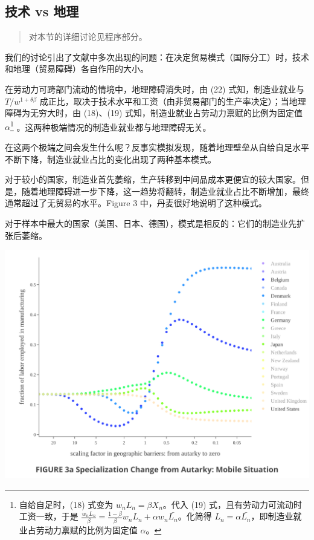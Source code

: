 \documentclass[
]{article}
\begin{document}
\hypertarget{ux6280ux672f-vs-ux5730ux7406}{%
\subsection{技术 vs 地理}\label{ux6280ux672f-vs-ux5730ux7406}}

\begin{quote}
对本节的详细讨论见程序部分。
\end{quote}

我们的讨论引出了文献中多次出现的问题：在决定贸易模式（国际分工）时，技术和地理（贸易障碍）各自作用的大小。

在劳动力可跨部门流动的情境中，地理障碍消失时，由 (22) 式知，制造业就业与 \(T/w^{1+\theta\beta}\) 成正比，取决于技术水平和工资（由非贸易部门的生产率决定）；当地理障碍为无穷大时，由 (18)、(19) 式知，制造业就业占劳动力禀赋的比例为固定值 \(\alpha\)\footnote{自给自足时，(18) 式变为
  \(w_n L_n = \beta X_n\)。代入 (19) 式，且有劳动力可流动时工资一致，于是
  \(\frac{w_n L_n}{\beta} = \frac{1-\beta}{\beta}w_n L_n+\alpha w_n \bar{L_n}\)。化简得
  \(L_n = \alpha \bar{L_n}\)，即制造业就业占劳动力禀赋的比例为固定值 \(\alpha\)。} 。这两种极端情况的制造业就业都与地理障碍无关。

在这两个极端之间会发生什么呢？反事实模拟发现，随着地理壁垒从自给自足水平不断下降，制造业就业占比的变化出现了两种基本模式。

对于较小的国家，制造业首先萎缩，生产转移到中间品成本更便宜的较大国家。但是，随着地理障碍进一步下降，这一趋势将翻转，制造业就业占比不断增加，最终通常超过了无贸易的水平。Figure 3 中，丹麦很好地说明了这种模式。

对于样本中最大的国家（美国、日本、德国），模式是相反的：它们的制造业先扩张后萎缩。

\begin{center}\includegraphics[width=1\linewidth]{img/Figure3} \end{center}
\end{document}

